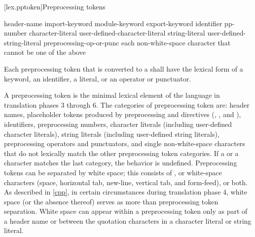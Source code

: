 [lex.pptoken]{Preprocessing tokens}

%
\begin{bnf}
\br
    header-name\br
    import-keyword\br
    module-keyword\br
    export-keyword\br
    identifier\br
    pp-number\br
    character-literal\br
    user-defined-character-literal\br
    string-literal\br
    user-defined-string-literal\br
    preprocessing-op-or-punc\br
    \textnormal{each non-white-space character that cannot be one of the above}
\end{bnf}

\pnum
Each preprocessing token that is converted to a 
shall have the lexical form of a keyword, an identifier, a literal,
or an operator or punctuator.

\pnum
A preprocessing token is the minimal lexical element of the language in translation
phases 3 through 6. The categories of preprocessing token are: header names,
placeholder tokens produced by preprocessing  and  directives
(, , and ),
identifiers, preprocessing numbers, character literals (including user-defined character
literals), string literals (including user-defined string literals), preprocessing
operators and punctuators, and single non-white-space characters that do not lexically
match the other preprocessing token categories. If a  or a  character
matches the last category, the behavior is undefined. Preprocessing tokens can be
separated by
%
white space;
%
this consists of , or white-space
characters (space, horizontal tab, new-line, vertical tab, and
form-feed), or both. As described in \ref{cpp}, in certain
circumstances during translation phase 4, white space (or the absence
thereof) serves as more than preprocessing token separation. White space
can appear within a preprocessing token only as part of a header name or
between the quotation characters in a character literal or
string literal.

